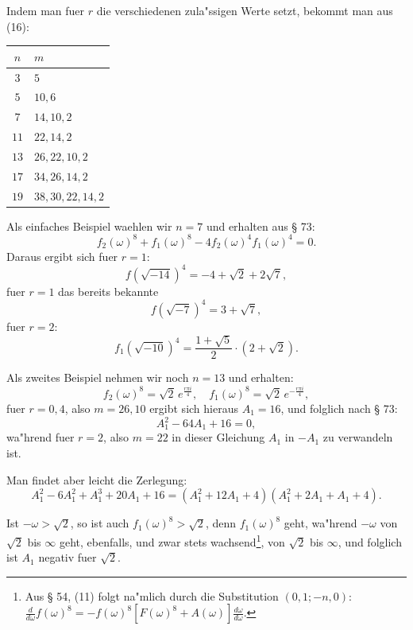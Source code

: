 \documentclass[12pt,a4paper]{article}
\theoremstyle{plain}
\theoremstyle{definition}
\theoremstyle{remark}
\begin{document}
Indem man fuer $r$ die verschiedenen zula"ssigen Werte setzt, bekommt man aus (16):
\begin{center}
\begin{tabular}{c|l}
$n$ & $m$ \\ \hline
$3$  & $5$ \\
$5$  & $10, 6$ \\
$7$  & $14, 10, 2$ \\
$11$ & $22, 14, 2$ \\
$13$ & $26, 22, 10, 2$ \\
$17$ & $34, 26, 14, 2$ \\
$19$ & $38, 30, 22, 14, 2$
\end{tabular}
\end{center}

Als einfaches Beispiel waehlen wir $n = 7$ und erhalten aus \S{} 73:
\[
f_2(\omega)^8 + f_1(\omega)^8 - 4f_2(\omega)^4 f_1(\omega)^4 = 0.
\]
Daraus ergibt sich fuer $r = 1$:
\begin{equation}\label{eq:130_22}
f(\sqrt{-14})^4 = -4 + \sqrt{2} + 2\sqrt{7},
\end{equation}
fuer $r = 1$ das bereits bekannte
\begin{equation}\label{eq:130_23}
f(\sqrt{-7})^4 = 3 + \sqrt{7},
\end{equation}
fuer $r = 2$:
\begin{equation}\label{eq:130_24}
f_1(\sqrt{-10})^4 = \frac{1 + \sqrt{5}}{2} \cdot (2 + \sqrt{2}).
\end{equation}

Als zweites Beispiel nehmen wir noch $n = 13$ und erhalten:
\begin{equation}\label{eq:130_25}
f_2(\omega)^8 = \sqrt{2}\, e^{\frac{r\pi i}{4}}, \quad f_1(\omega)^8 = \sqrt{2}\, e^{-\frac{r\pi i}{4}},
\end{equation}
fuer $r = 0, 4$, also $m = 26, 10$ ergibt sich hieraus $A_1 = 16$, und folglich nach \S{} 73:
\[
A_1^2 - 64A_1 + 16 = 0,
\]
wa"hrend fuer $r = 2$, also $m = 22$ in dieser Gleichung $A_1$ in $-A_1$ zu verwandeln ist.

Man findet aber leicht die Zerlegung:
\[
A_1^2 - 6A_1^2 + A_1^3 + 20A_1 + 16 = (A_1^2 + 12A_1 + 4)(A_1^2 + 2A_1 + A_1 + 4).
\]


Ist $-\omega > \sqrt{2}$, so ist auch $f_1(\omega)^8 > \sqrt{2}$, denn $f_1(\omega)^8$ geht, wa"hrend $-\omega$ von $\sqrt{2}$ bis $\infty$ geht, ebenfalls, und zwar stets wachsend\footnote{Aus \S{} 54, (11) folgt na"mlich durch die Substitution $(0, 1; -n, 0)$: $\frac{d}{d\omega} f(\omega)^8 = -f(\omega)^8 [F(\omega)^8 + A(\omega)] \frac{d\omega}{d\omega}$.}, von $\sqrt{2}$ bis $\infty$, und folglich ist $A_1$ negativ fuer $\sqrt{2}$.
\end{document}
